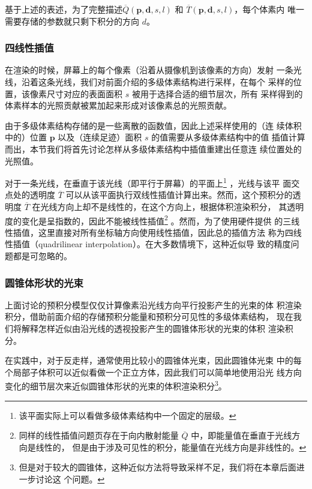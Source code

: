 基于上述的表述，为了完整描述$\overline{Q}(\mathbf{p},\mathbf{d},s,l)$ 和 $\overline{T}(\mathbf{p},\mathbf{d},s,l)$，每个体素内 唯一需要存储的参数就只剩下积分的方向 $d$。



\subsubsection{四线性插值}\label{sec:vct-quadrilinear}
在渲染的时候，屏幕上的每个像素（沿着从摄像机到该像素的方向）发射 一条光线，沿着这条光线，我们对前面介绍的多级体素结构进行采样，在每个 采样的位置，该像素尺寸对应的表面面积 $s$ 被用于选择合适的细节层次，所有 采样得到的体素样本的光照贡献被累加起来形成对该像素总的光照贡献。

由于多级体素结构存储的是一些离散的函数值，因此上述采样使用的（连 续体积中的）位置 $\mathbf{p}$ 以及（连续足迹）面积 $s$ 的值需要从多级体素结构中的值 插值计算而出，本节我们将首先讨论怎样从多级体素结构中插值重建出任意连 续位置处的光照值。

对于一条光线，在垂直于该光线（即平行于屏幕）的平面上\footnote{该平面实际上可以看做多级体素结构中一个固定的层级。} ，光线与该平 面交点处的透明度 $\overline{T}$ 可以从该平面执行双线性插值计算出来。然而，这个预积分的透明度 $\overline{T}$ 在光线方向上却不是线性的，在这个方向上，根据体积渲染积分， 其透明度的变化是呈指数的，因此不能被线性插值\footnote{同样的线性插值问题页存在于向内散射能量 $\overline{Q}$ 中，即能量值在垂直于光线方向是线性的， 但是由于涉及可见性的积分，能量值在光线方向是非线性的。} 。然而，为了使用硬件提供 的三线性插值，这里直接对所有坐标轴方向使用线性插值，因此总的插值方法 称为四线性插值（quadrilinear interpolation）。在大多数情境下，这种近似导 致的精度问题都是可忽略的。



\subsubsection{圆锥体形状的光束}
上面讨论的预积分模型仅仅计算像素沿光线方向平行投影产生的光束的体 积渲染积分，借助前面介绍的存储预积分能量和预积分可见性的多级体素结构， 现在我们将解释怎样近似由沿光线的透视投影产生的圆锥体形状的光束的体积 渲染积分。

在实践中，对于反走样，通常使用比较小的圆锥体光束，因此圆锥体光束 中的每个局部子体积可以近似看做一个正立方体，因此我们可以简单地使用沿光 线方向变化的细节层次来近似圆锥体形状的光束的体积渲染积分\footnote{但是对于较大的圆锥体，这种近似方法将导致采样不足，我们将在本章后面进一步讨论这 个问题。}。

